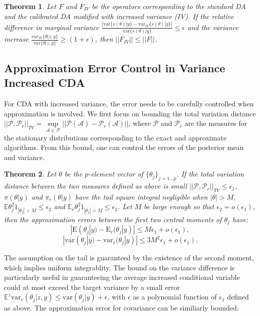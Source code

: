 \documentclass[10pt]{article}
\newtheorem{theorem}{Theorem}
\begin{document}
\begin{theorem}
Let $F$ and $F_{IV}$ be the operators corresponding to the standard DA and the calibrated DA modified with increased variance (IV). If the relative difference in marginal variance $\frac{|\mbox{var}\{s(\theta)|y  \} - \mbox{var}_{IV}\{s(\theta)|y\} |}{\mbox{var}\{s(\theta)|y \} }\le \epsilon$ and the variance increase $\frac{ var_{IV}\{ \theta|z,y\}}{ var\{ \theta|z,y\}} \ge (1+\epsilon) $, then $||F_{IV}||\le ||F||$.
\end{theorem}

\subsection{Approximation Error Control in Variance Increased CDA}

For CDA with increased variance, the error needs to be carefully controlled when approximation is involved. We first focus on bounding the total variation distance $||\mathcal{P},\mathcal{P}_r ||_{TV}= \underset{\mathcal A\in \mathcal F}\sup ||\mathcal{P}(\mathcal A)-\mathcal{P}_r(\mathcal A)||$, where $\mathcal{P}$ and $\mathcal{P}_r$ are the measures for the stationary distributions corresponding to the exact and approximate algorithms. From this bound, one can control the errors of the posterior mean and variance.

\begin{theorem}
Let $\theta$ be the $p$-element vector of $\{\theta_j\}_{j=1\ldots p}$.
If the total variation distance between the two measures defined as above is small $||\mathcal{P},\mathcal{P}_r ||_{TV}\le \epsilon_1$, $\pi(\theta|y)$ and $\pi_r(\theta|y)$ have the tail square integral negligible when $|\theta|>M$,  $\mathbb{E} \theta_j^2 {1}_{|\theta_j|>M}\le \epsilon_2$ and $\mathbb{E}_{r} \theta_j^2 {1}_{|\theta_j|>M}\le \epsilon_2$. Let $M$ be large enough so that $\epsilon_2=o(\epsilon_1)$, then the approximation errors between the first two central moments of $\theta_j$ have:
$$|\mbox{E}(\theta_j|y)-\mbox{E}_r(\theta_j|y)|\le M\epsilon_1+ o(\epsilon_1),$$
$$|\mbox{var}(\theta_j|y)-\mbox{var}_r(\theta_j|y)|\le 3M^2\epsilon_1+o(\epsilon_1).$$
\end{theorem}
 
The assumption on the tail is guaranteed by the existence of the second moment, which implies uniform integrablity. The bound on the variance difference is particularly useful in guaranteeing the average increased conditional variable could at most exceed the target variance by a small error $\mathbb{E}^z\mbox{var}_r(\theta_j|z,y)\le\mbox{var}(\theta_j|y)+\epsilon$, with $\epsilon$ as a polynomial function of $\epsilon_1$ defined as above. The approximation error for covariance can be similiarly bounded:
\end{document}
